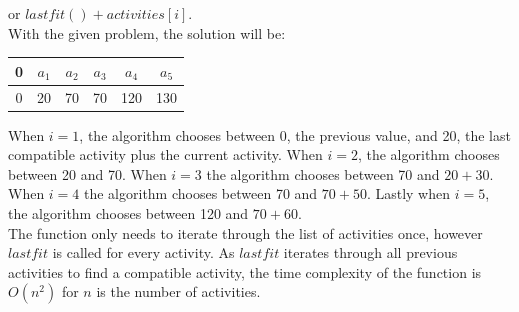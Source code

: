 \documentclass{article}
\begin{document}
\begin{enumerate}
        or $lastfit() + activities[i]$. \\
        With the given problem, the solution will be:
        \begin{center}
            \begin{tabular}{| c | c | c | c | c | c |}
                \hline
                0 & $a_1$ & $a_2$ & $a_3$ & $a_4$ & $a_5$\\
                \hline
                0 & 20 & 70 & 70 & 120 & 130\\
                \hline
            \end{tabular}
        \end{center}
        When $i=1$, the algorithm chooses between 0, the previous value, and 
        20, the last compatible activity plus the current activity. When $i=2$,
        the algorithm chooses between 20 and 70. When $i=3$ the algorithm 
        chooses between 70 and $20 + 30$. When $i=4$ the algorithm chooses 
        between 70 and $70 + 50$. Lastly when $i=5$, the algorithm chooses 
        between 120 and $70 + 60$.\\
        The function only needs to iterate through the list of activities once,
        however $lastfit$ is called for every activity. As $lastfit$ iterates
        through all previous activities to find a compatible activity, the 
        time complexity of the function is $O(n^2)$ for $n$ is the number of 
        activities.
    \end{enumerate}
\end{document}
